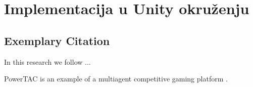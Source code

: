 \clearpage
\section{Implementacija u Unity okru\v{z}enju}
\label{sec:Section_Name_X}

\subsection{Exemplary Citation}
\label{subsec:Section_Name_X/cite}


In this research we follow ...


PowerTAC is an example of a multiagent competitive gaming platform .